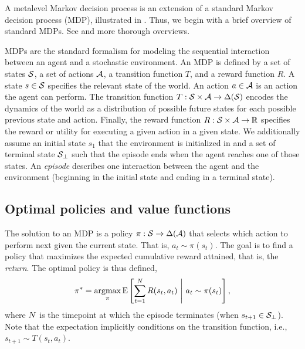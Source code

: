 A metalevel Markov decision process is an extension of a standard Markov decision process (MDP), illustrated in . Thus, we begin with a brief overview of standard MDPs. See \citet{puterman2014markov} and \citet{sutton2018reinforcement} more thorough overviews.

MDPs are the standard formalism for modeling the sequential interaction between an agent and a stochastic environment. An MDP is defined by a set of states $\S$, a set of actions $\A$, a transition function $T$, and a reward function $R$. A state $s \in \S$ specifies the relevant state of the world. An action $a \in \A$ is an action the agent can perform. The transition function $T: \S \times \A \rightarrow \Delta(\S)$\footnotemark{} encodes the dynamics of the world as a distribution of possible future states for each possible previous state and action. Finally, the reward function $R: \S \times \A \rightarrow \R $ specifies the reward or utility for executing a given action in a given state. We additionally assume an initial state $s_1$ that the environment is initialized in and a set of terminal state $\S_\bot$ such that the episode ends when the agent reaches one of those states. An \emph{episode} describes one interaction between the agent and the environment (beginning in the initial state and ending in a terminal state).



\subsection{Optimal policies and value functions}

The solution to an MDP is a policy $\pi: \S \rightarrow \Delta(\A)$ that selects which action to perform next given the current state. That is, $a_t \sim \pi(s_t)$. The goal is to find a policy that maximizes the expected cumulative reward attained, that is, the \emph{return}. The optimal policy is thus defined,
\begin{equation}\label{eq:optimal-policy}
  \pi^* = \argmax_\pi \expect{
    \sum_{t=1}^{\tmax} R(s_t, a_t)
  }{
   a_t \sim \pi(s_t)
  },
\end{equation}
where $\tmax$ is the timepoint at which the episode terminates (when $s_{t+1} \in \S_\bot$). Note that the expectation implicitly conditions on the transition function, i.e., $s_{t+1} \sim T(s_t, a_t)$.

